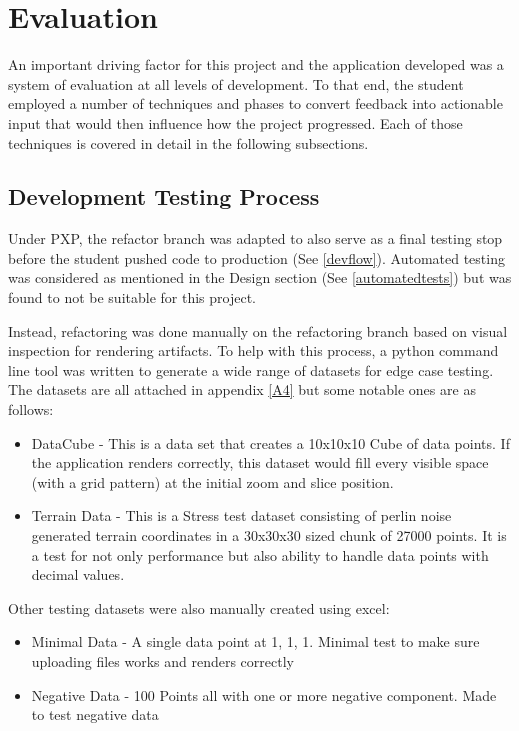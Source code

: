 \section{Evaluation}
An important driving factor for this project and the application developed was a system of evaluation at all levels of development. To that end, the student employed a
number of techniques and phases to convert feedback into actionable input that would then influence how the project progressed. Each of those techniques is covered in detail in the following subsections.

\subsection{Development Testing Process} \label{devtest}
Under PXP, the refactor branch was adapted to also serve as a final testing stop before the student pushed code to production (See \ref{devflow}). Automated testing was considered as mentioned in the Design section (See \ref{automatedtests}) but was found to not be suitable for this project.

Instead, refactoring was done manually on the refactoring branch based on visual inspection for rendering artifacts. To help with this process, a python command line tool was written to generate a wide range of datasets for edge case testing. The datasets are all attached in appendix \ref{A4} but some notable ones are as follows:

\begin{itemize}
    \item DataCube - This is a data set that creates a 10x10x10 Cube of data points. If the application renders correctly, this dataset would fill every visible space (with a grid pattern) at the initial zoom and slice position.
    \item Terrain Data - This is a Stress test dataset consisting of perlin noise generated terrain coordinates in a 30x30x30 sized chunk of 27000 points. It is a test for not only performance but also ability to handle data points with decimal values.
\end{itemize}

Other testing datasets were also manually created using excel:
\begin{itemize}
    \item Minimal Data - A single data point at 1, 1, 1. Minimal test to make sure uploading files works and renders correctly
    \item Negative Data - 100 Points all with one or more negative component. Made to test negative data
\end{itemize}

